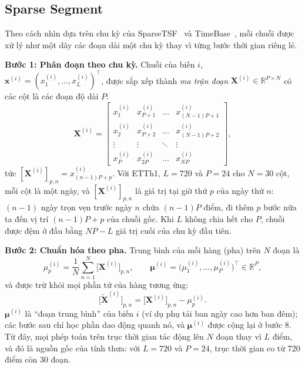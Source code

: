 \documentclass[conference]{IEEEtran}
\newcommand{\R}{\mathbb{R}}
\begin{document}
\subsection{Sparse Segment}
\label{sec:segment}

Theo cách nhìn dựa trên chu kỳ của SparseTSF~\cite{Lin2024SparseTSF} và TimeBase~\cite{Huang2025TimeBase}, mỗi chuỗi được
xử lý như một dãy các đoạn dài một chu kỳ thay vì từng bước thời gian riêng lẻ.

\textbf{Bước 1: Phân đoạn theo chu kỳ.} Chuỗi của biến $i$, $\mathbf{x}^{(i)}=(x^{(i)}_1,\dots,x^{(i)}_L)^{\top}$, được
sắp xếp thành \emph{ma trận đoạn} $\mathbf{X}^{(i)}\in\R^{P\times N}$ có các cột là các đoạn độ dài $P$:
\begin{equation}
\mathbf{X}^{(i)}=
\begin{bmatrix}
x^{(i)}_1 & x^{(i)}_{P+1} & \dots & x^{(i)}_{(N-1)P+1}\\
x^{(i)}_2 & x^{(i)}_{P+2} & \dots & x^{(i)}_{(N-1)P+2}\\
\vdots & \vdots & \ddots & \vdots\\
x^{(i)}_P & x^{(i)}_{2P} & \dots & x^{(i)}_{NP}
\end{bmatrix},
\label{eq:segment}
\end{equation}
tức $[\mathbf{X}^{(i)}]_{p,n}=x^{(i)}_{(n-1)P+p}$. Với ETTh1, $L=720$ và $P=24$ cho $N=30$ cột, mỗi cột là một ngày, và
$[\mathbf{X}^{(i)}]_{p,n}$ là giá trị tại giờ thứ $p$ của ngày thứ $n$: $(n-1)$ ngày trọn vẹn trước ngày $n$ chứa $(n-1)P$
điểm, đi thêm $p$ bước nữa ta đến vị trí $(n-1)P+p$ của chuỗi gốc. Khi $L$ không chia hết cho $P$, chuỗi được đệm ở đầu
bằng $NP-L$ giá trị cuối của chu kỳ đầu tiên.

\textbf{Bước 2: Chuẩn hóa theo pha.} Trung bình của mỗi hàng (pha) trên $N$ đoạn là
\begin{equation}
\mu^{(i)}_p=\frac{1}{N}\sum_{n=1}^{N}\big[\mathbf{X}^{(i)}\big]_{p,n},\qquad
\bm{\mu}^{(i)}=\big(\mu^{(i)}_1,\dots,\mu^{(i)}_P\big)^{\top}\in\R^{P},
\label{eq:phase-mean}
\end{equation}
và được trừ khỏi mọi phần tử của hàng tương ứng:
\begin{equation}
\big[\tilde{\mathbf{X}}^{(i)}\big]_{p,n}=\big[\mathbf{X}^{(i)}\big]_{p,n}-\mu^{(i)}_p .
\label{eq:period-norm}
\end{equation}
$\bm{\mu}^{(i)}$ là ``đoạn trung bình'' của biến $i$ (ví dụ phụ tải ban ngày cao hơn ban đêm); các bước sau chỉ học phần
dao động quanh nó, và $\bm{\mu}^{(i)}$ được cộng lại ở bước 8. Từ đây, mọi phép toán trên trục thời gian tác động lên $N$
đoạn thay vì $L$ điểm, và đó là nguồn gốc của tính thưa: với $L=720$ và $P=24$, trục thời gian co từ 720 điểm còn 30
đoạn.
\end{document}
